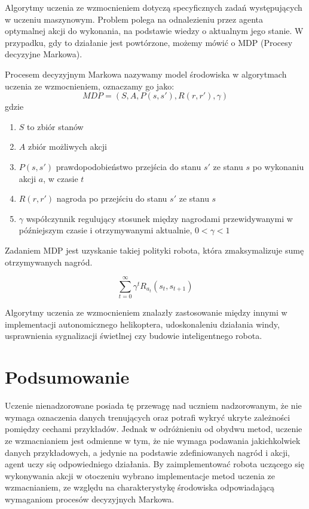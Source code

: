 Algorytmy uczenia ze wzmocnieniem dotyczą specyficznych zadań występujących w uczeniu maszynowym. Problem polega na 
odnalezieniu przez agenta optymalnej akcji do wykonania, na podstawie wiedzy o aktualnym jego stanie. W przypadku, 
gdy to działanie jest powtórzone, możemy mówić o MDP (Procesy decyzyjne Markowa).

Procesem decyzyjnym Markowa nazywamy model środowiska w algorytmach uczenia ze wzmocnieniem, oznaczamy go jako:\\
$$MDP = (S, A, P(s, s'), R(r, r'), \gamma)$$
gdzie
\begin{enumerate}
 \item $S$ to zbiór stanów
 \item $A$ zbiór możliwych akcji
 \item $P(s, s')$ prawdopodobieństwo przejścia do stanu $s'$ ze stanu $s$ po wykonaniu akcji $a$, w czasie $t$
 \item $R(r, r')$ nagroda po przejściu do stanu $s'$ ze stanu $s$
 \item $\gamma$ współczynnik regulujący stosunek między nagrodami przewidywanymi w późniejszym czasie i 
otrzymywanymi aktualnie, $0 < \gamma < 1$
\end{enumerate}

Zadaniem MDP jest uzyskanie takiej polityki robota, która zmaksymalizuje sumę otrzymywanych nagród.

$$\sum\limits_{t=0}^\infty \gamma^{t} R_{a_{t}}(s_{t}, s_{t+1})$$

Algorytmy uczenia ze wzmocnieniem znalazły zastosowanie między innymi w implementacji autonomicznego 
helikoptera\cite{abbeel2007application}, udoskonaleniu działania windy\cite{barto1996improving}, usprawnienia 
sygnalizacji świetlnej\cite{wiering2000multi} czy budowie inteligentnego robota\cite{kimura2001reinforcement}.


\section{Podsumowanie}

Uczenie nienadzorowane posiada tę przewagę nad uczniem nadzorowanym, że nie wymaga oznaczenia danych trenujących 
oraz potrafi wykryć ukryte zależności pomiędzy cechami przykładów. Jednak w odróżnieniu od obydwu metod, uczenie ze 
wzmacnianiem jest odmienne w tym, że nie wymaga podawania jakichkolwiek danych przykładowych, a jedynie na podstawie 
zdefiniowanych nagród i akcji, agent uczy się odpowiedniego działania.
By zaimplementować robota uczącego się wykonywania akcji w otoczeniu wybrano implementacje metod uczenia ze 
wzmacnianiem, ze względu na charakterystykę środowiska odpowiadającą wymaganiom procesów decyzyjnych Markowa.












